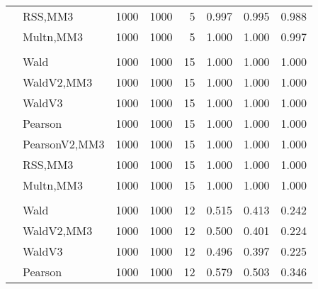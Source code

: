 \documentclass[
]{article}
\begin{document}
\begin{table}[H]
{\begin{tabular}[t]{llrrrrrr}
\hspace{1em} & RSS,MM3 & 1000 & 1000 & 5 & 0.997 & 0.995 & 0.988\\

\hspace{1em} & Multn,MM3 & 1000 & 1000 & 5 & 1.000 & 1.000 & 0.997\\
\cmidrule{1-8}
\addlinespace[0.3em]
\multicolumn{8}{l}{\textbf{1F 15V}}\\
\hspace{1em} & Wald & 1000 & 1000 & 15 & 1.000 & 1.000 & 1.000\\

\hspace{1em} & WaldV2,MM3 & 1000 & 1000 & 15 & 1.000 & 1.000 & 1.000\\

\hspace{1em} & WaldV3 & 1000 & 1000 & 15 & 1.000 & 1.000 & 1.000\\

\hspace{1em} & Pearson & 1000 & 1000 & 15 & 1.000 & 1.000 & 1.000\\

\hspace{1em} & PearsonV2,MM3 & 1000 & 1000 & 15 & 1.000 & 1.000 & 1.000\\

\hspace{1em} & RSS,MM3 & 1000 & 1000 & 15 & 1.000 & 1.000 & 1.000\\

\hspace{1em} & Multn,MM3 & 1000 & 1000 & 15 & 1.000 & 1.000 & 1.000\\
\cmidrule{1-8}
\addlinespace[0.3em]
\multicolumn{8}{l}{\textbf{2F 10V}}\\
\hspace{1em} & Wald & 1000 & 1000 & 12 & 0.515 & 0.413 & 0.242\\

\hspace{1em} & WaldV2,MM3 & 1000 & 1000 & 12 & 0.500 & 0.401 & 0.224\\

\hspace{1em} & WaldV3 & 1000 & 1000 & 12 & 0.496 & 0.397 & 0.225\\

\hspace{1em} & Pearson & 1000 & 1000 & 12 & 0.579 & 0.503 & 0.346\\


\end{tabular}}
\end{table}
\end{document}
